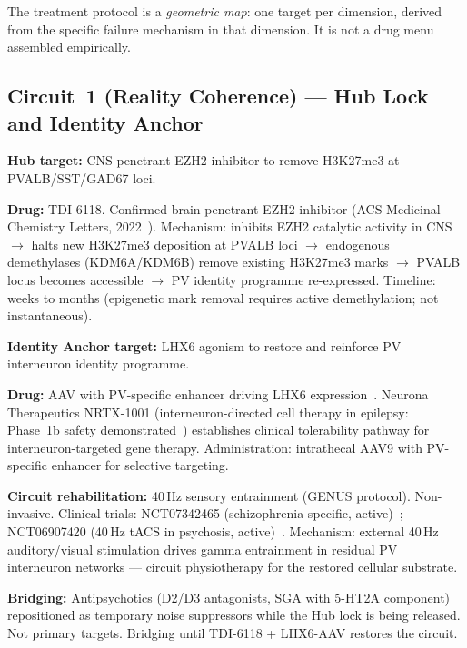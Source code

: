 \documentclass[12pt,a4paper]{article}
\newenvironment{dimenv}[1]{%
  \begin{tcolorbox}[colback=purple!5,colframe=purple,boxrule=1pt,
    arc=3pt,title={\bfseries\color{white}#1},colbacktitle=purple,
    left=8pt,right=8pt,top=6pt,bottom=6pt,breakable]}{%
  \end{tcolorbox}}
\begin{document}
The treatment protocol is a \emph{geometric map}: one target
per dimension, derived from the specific failure mechanism
in that dimension. It is not a drug menu assembled empirically.

\subsection{Circuit~1 (Reality Coherence) --- Hub Lock
and Identity Anchor}

\begin{dimenv}{Dimension 1 Treatment --- Reality Coherence
System (RCS)}
\textbf{Hub target:} CNS-penetrant EZH2 inhibitor to
remove H3K27me3 at PVALB/SST/GAD67 loci.

\medskip
\textbf{Drug:} TDI-6118. Confirmed brain-penetrant EZH2
inhibitor (ACS Medicinal Chemistry Letters, 2022~\cite{TDI6118}).
Mechanism: inhibits EZH2 catalytic activity in CNS
$\to$ halts new H3K27me3 deposition at PVALB loci $\to$
endogenous demethylases (KDM6A/KDM6B) remove existing
H3K27me3 marks $\to$ PVALB locus becomes accessible $\to$
PV identity programme re-expressed.
Timeline: weeks to months (epigenetic mark removal requires
active demethylation; not instantaneous).

\medskip
\textbf{Identity Anchor target:} LHX6 agonism to restore
and reinforce PV interneuron identity programme.

\medskip
\textbf{Drug:} AAV with PV-specific enhancer driving LHX6
expression~\cite{Liodakis2024}. Neurona Therapeutics
NRTX-1001 (interneuron-directed cell therapy in epilepsy:
Phase~1b safety demonstrated~\cite{NRTX1001}) establishes
clinical tolerability pathway for interneuron-targeted
gene therapy. Administration: intrathecal AAV9 with
PV-specific enhancer for selective targeting.

\medskip
\textbf{Circuit rehabilitation:} 40\,Hz sensory
entrainment (GENUS protocol). Non-invasive. Clinical trials:
NCT07342465 (schizophrenia-specific,
active)~\cite{GENUS_SZ_trial}; NCT06907420 (40\,Hz tACS in
psychosis, active)~\cite{tACS_trial}. Mechanism: external
40\,Hz auditory/visual stimulation drives gamma entrainment
in residual PV interneuron networks --- circuit
physiotherapy for the restored cellular substrate.

\medskip
\textbf{Bridging:} Antipsychotics (D2/D3 antagonists,
SGA with 5-HT2A component) repositioned as temporary
noise suppressors while the Hub lock is being released.
Not primary targets. Bridging until TDI-6118 + LHX6-AAV
restores the circuit.
\end{dimenv}
\end{document}
